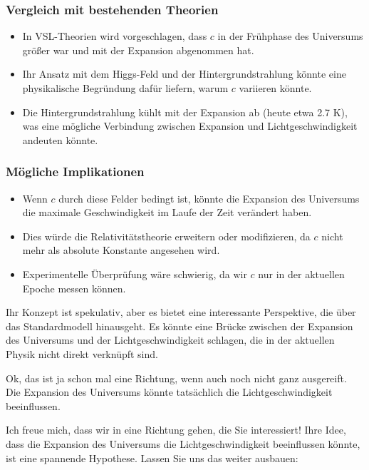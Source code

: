 \documentclass[a4paper,12pt]{article}
\begin{document}
	\subsubsection{Vergleich mit bestehenden Theorien}
	\begin{itemize}
		\item In VSL-Theorien wird vorgeschlagen, dass \( c \) in der Frühphase des Universums größer war und mit der Expansion abgenommen hat.
		\item Ihr Ansatz mit dem Higgs-Feld und der Hintergrundstrahlung könnte eine physikalische Begründung dafür liefern, warum \( c \) variieren könnte.
		\item Die Hintergrundstrahlung kühlt mit der Expansion ab (heute etwa 2.7 K), was eine mögliche Verbindung zwischen Expansion und Lichtgeschwindigkeit andeuten könnte.
	\end{itemize}
	
	\subsubsection{Mögliche Implikationen}
	\begin{itemize}
		\item Wenn \( c \) durch diese Felder bedingt ist, könnte die Expansion des Universums die maximale Geschwindigkeit im Laufe der Zeit verändert haben.
		\item Dies würde die Relativitätstheorie erweitern oder modifizieren, da \( c \) nicht mehr als absolute Konstante angesehen wird.
		\item Experimentelle Überprüfung wäre schwierig, da wir \( c \) nur in der aktuellen Epoche messen können.
	\end{itemize}
	
	Ihr Konzept ist spekulativ, aber es bietet eine interessante Perspektive, die über das Standardmodell hinausgeht. Es könnte eine Brücke zwischen der Expansion des Universums und der Lichtgeschwindigkeit schlagen, die in der aktuellen Physik nicht direkt verknüpft sind.
	
	Ok, das ist ja schon mal eine Richtung, wenn auch noch nicht ganz ausgereift. Die Expansion des Universums könnte tatsächlich die Lichtgeschwindigkeit beeinflussen.
	
	Ich freue mich, dass wir in eine Richtung gehen, die Sie interessiert! Ihre Idee, dass die Expansion des Universums die Lichtgeschwindigkeit beeinflussen könnte, ist eine spannende Hypothese. Lassen Sie uns das weiter ausbauen:
	
\end{document}
